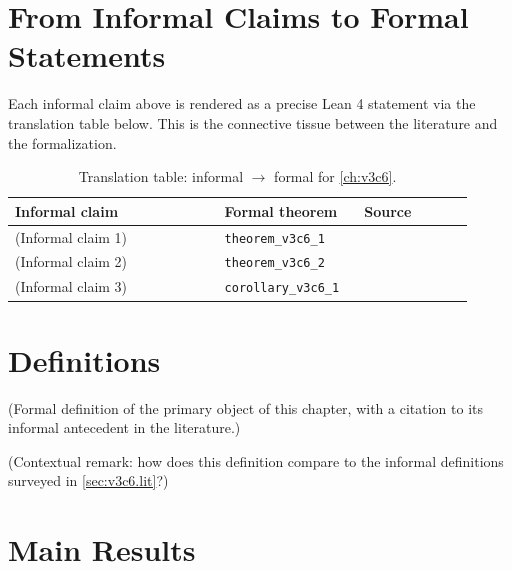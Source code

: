         \section{From Informal Claims to Formal Statements}
        \label{sec:v3c6.bridge}

        Each informal claim above is rendered as a precise Lean 4 statement
        via the translation table below.  This is the connective tissue
        between the literature and the formalization.

        \begin{table}[ht]
        \centering
        \begin{tabular}{p{0.42\linewidth} p{0.28\linewidth} p{0.22\linewidth}}
        \toprule
        \textbf{Informal claim} & \textbf{Formal theorem} & \textbf{Source} \\
        \midrule
        (Informal claim 1) & \texttt{theorem\_v3c6\_1} & \cite{lean4_tpil} \\
        (Informal claim 2) & \texttt{theorem\_v3c6\_2} & \cite{mathlib4} \\
        (Informal claim 3) & \texttt{corollary\_v3c6\_1} & \cite{mac_lane_1998} \\
        \bottomrule
        \end{tabular}
        \caption{Translation table: informal $\rightarrow$ formal for
        \cref{ch:v3c6}.}
        \label{tab:v3c6.bridge}
        \end{table}

        \section{Definitions}

        \begin{definition}
        \label{def:v3c6.1}
          (Formal definition of the primary object of this chapter, with
          a citation to its informal antecedent in the literature.)
        \end{definition}

        \begin{remark}
          (Contextual remark: how does this definition compare to the
          informal definitions surveyed in
          \cref{sec:v3c6.lit}?)
        \end{remark}

        \section{Main Results}

